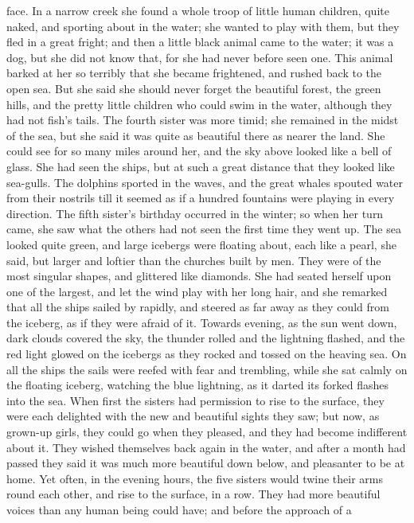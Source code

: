 face. In a narrow creek she found a whole troop of little human
children, quite naked, and sporting about in the water; she wanted
to play with them, but they fled in a great fright; and then a
little black animal came to the water; it was a dog, but she did not
know that, for she had never before seen one. This animal barked at
her so terribly that she became frightened, and rushed back to the
open sea. But she said she should never forget the beautiful forest,
the green hills, and the pretty little children who could swim in
the water, although they had not fish's tails.
    The fourth sister was more timid; she remained in the midst of the
sea, but she said it was quite as beautiful there as nearer the
land. She could see for so many miles around her, and the sky above
looked like a bell of glass. She had seen the ships, but at such a
great distance that they looked like sea-gulls. The dolphins sported
in the waves, and the great whales spouted water from their nostrils
till it seemed as if a hundred fountains were playing in every
direction.
    The fifth sister's birthday occurred in the winter; so when her
turn came, she saw what the others had not seen the first time they
went up. The sea looked quite green, and large icebergs were
floating about, each like a pearl, she said, but larger and loftier
than the churches built by men. They were of the most singular shapes,
and glittered like diamonds. She had seated herself upon one of the
largest, and let the wind play with her long hair, and she remarked
that all the ships sailed by rapidly, and steered as far away as
they could from the iceberg, as if they were afraid of it. Towards
evening, as the sun went down, dark clouds covered the sky, the
thunder rolled and the lightning flashed, and the red light glowed
on the icebergs as they rocked and tossed on the heaving sea. On all
the ships the sails were reefed with fear and trembling, while she sat
calmly on the floating iceberg, watching the blue lightning, as it
darted its forked flashes into the sea.
    When first the sisters had permission to rise to the surface, they
were each delighted with the new and beautiful sights they saw; but
now, as grown-up girls, they could go when they pleased, and they
had become indifferent about it. They wished themselves back again
in the water, and after a month had passed they said it was much
more beautiful down below, and pleasanter to be at home. Yet often, in
the evening hours, the five sisters would twine their arms round
each other, and rise to the surface, in a row. They had more beautiful
voices than any human being could have; and before the approach of a
